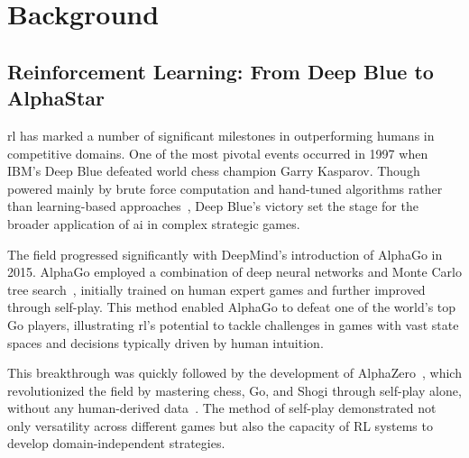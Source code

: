 \section{Background}%
\label{sec:background}



\begin{comment}

\subsection*{Markov Decision Processes}

\glspl*{mdp} are foundational to the field of reinforcement learning. 
An examination of the literature cited in this dissertation reveals that the terminology and 
descriptions of MDPs in early papers have significantly influenced the language still used in 
the field today.


\end{comment}

\subsection*{Reinforcement Learning: From Deep Blue to AlphaStar}

\gls{rl} has marked a number of significant milestones in outperforming humans in competitive domains.
One of the most pivotal events occurred in 1997 when IBM's Deep Blue defeated world chess champion
Garry Kasparov. Though powered mainly by brute force computation and hand-tuned algorithms rather
than learning-based approaches~\cite{campbell2002},
Deep Blue's victory set the stage for the broader application of \gls{ai} in complex strategic games.

The field progressed significantly with DeepMind's introduction of AlphaGo in 2015.
AlphaGo employed a combination of deep neural networks and Monte Carlo tree search~\cite{silver2016},
initially trained on human expert games and further improved through self-play.
This method enabled AlphaGo to defeat one of the world's top Go players, illustrating \gls{rl}'s
potential to tackle challenges in games with vast state spaces and decisions typically driven by
human intuition.

This breakthrough was quickly followed by the development of AlphaZero~\cite{silver2017},
which revolutionized the field by mastering chess, Go, and Shogi through self-play alone,
without any human-derived data~\cite{silver2017a}.
The method of self-play demonstrated not only versatility across different games but also the
capacity of RL systems to develop domain-independent strategies.


